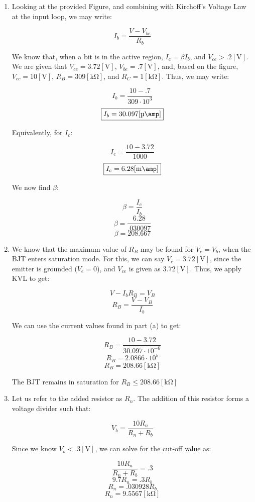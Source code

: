 \begin{enumerate}

  \item

    Looking at the provided Figure, and combining with Kirchoff's Voltage Law at the input loop, we may write:

    $$I_b=\frac{V-V_{be}}{R_b}$$

    We know that, when a bit is in the active region, $I_c=\beta I_b$, and $V_{ce}>.2[\si{\volt}]$. We are given that $V_{ce}=3.72[\si{\volt}]$, $V_{be}=.7[\si{\volt}]$, and, based on the figure, $V_{cc}=10[\si{\volt}]$, $R_B=309[\si{\kilo\ohm}]$, and $R_C=1[\si{\kilo\ohm}]$. Thus, we may write:

    $$I_b=\frac{10-.7}{309\cdot10^3}$$
    $$\boxed{I_b=30.097[\si{\micro\amp}]}$$

    Equivalently, for $I_c$:

    $$I_c=\frac{10-3.72}{1000}$$
    $$\boxed{I_c=6.28[\si{\milli\amp}]}$$

    We now find $\beta$:

    $$\beta=\frac{I_c}{I_b}$$
    $$\beta=\frac{6.28}{.030097}$$
    $$\boxed{\beta=208.667}$$

  \item

    We know that the maximum value of $R_B$ may be found for $V_c=V_b$, when the BJT enters saturation mode. For this, we can say $V_c=3.72[\si{\volt}]$, since the emitter is grounded ($V_e=0$), and $V_{ce}$ is given as $3.72[\si{\volt}]$. Thus, we apply KVL to get:

    $$V-I_bR_B=V_B$$
    $$R_B=\frac{V-V_B}{I_b}$$

    We can use the current values found in part (a) to get:

    $$R_B=\frac{10-3.72}{30.097\cdot10^{-6}}$$
    $$R_B=2.0866\cdot10^{5}$$
    $$\boxed{R_B=208.66[\si{\kilo\ohm}]}$$

    The BJT remains in saturation for $R_B\leq 208.66[\si{\kilo\ohm}]$

  \item

    Let us refer to the added resistor as $R_n$. The addition of this resistor forms a voltage divider such that:

    $$V_b=\frac{10R_n}{R_n+R_b}$$

    Since we know $V_b<.3[\si{\volt}]$, we can solve for the cut-off value as:

    $$\frac{10R_n}{R_n+R_b}=.3$$
    $$9.7R_n=.3R_b$$
    $$R_n=.030928R_b$$
    $$\boxed{R_n=9.5567[\si{\kilo\ohm}]}$$


\end{enumerate}
